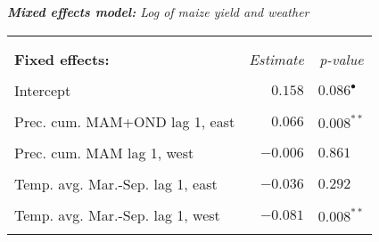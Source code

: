 \documentclass[a4paper,12pt]{article}
\begin{document}
\pagebreak






{\centering
\begin{threeparttable}


\singlespacing
\caption{\textit{\textbf{Mixed  effects model:} Log of maize yield and weather}}
\label{Peggy45ln} 
\centering
\begin{small}
\begin{tabular}{lrl} 
\hline \vspace{-0.2cm} \\
  
\vspace{-0.2cm} \\

  
  \multicolumn{1}{l}{\vspace{0.1cm}\textbf{Fixed effects:}}  &\multicolumn{1}{c}{\textit{Estimate}} &\multicolumn{1}{c}{\textit{p-value}}\\
 \hline 
\hline
\\
\vspace{-0.2cm}Intercept&$0.158$&$0.086^{\bullet}$\\
  \\
\vspace{-0.2cm}Prec. cum. MAM+OND lag 1, east&$0.066$&$0.008^{**}$\\
  \\
  \vspace{-0.2cm}Prec. cum. MAM lag 1, west&$-0.006$&$0.861$\\
  \\
  \vspace{-0.2cm}Temp. avg. Mar.-Sep. lag 1, east&$-0.036$&$0.292$\\
  \\
    \vspace{-0.2cm}Temp. avg. Mar.-Sep. lag 1, west&$-0.081$&$0.008^{**}$\\
  \\
  

\end{tabular}
\end{small}
\end{threeparttable}}
\end{document}
